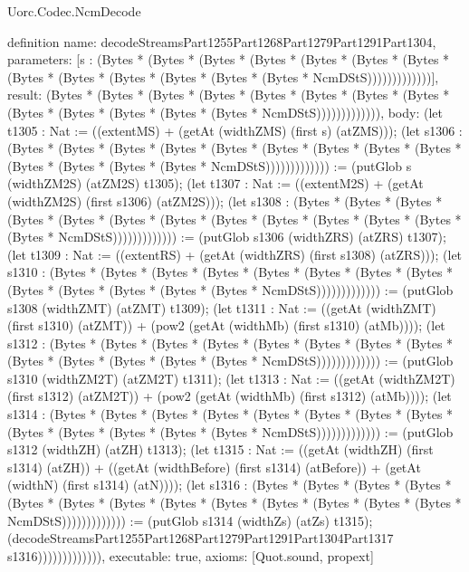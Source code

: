 \begin{lexlean}{Uorc.Codec.NcmDecode}
\begin{semanticmodule}
definition{
  name: decodeStreamsPart1255Part1268Part1279Part1291Part1304,
  parameters: [s : (Bytes * (Bytes * (Bytes * (Bytes * (Bytes * (Bytes * (Bytes * (Bytes * (Bytes * (Bytes * (Bytes * (Bytes * (Bytes * NcmDStS)))))))))))))],
  result: (Bytes * (Bytes * (Bytes * (Bytes * (Bytes * (Bytes * (Bytes * (Bytes * (Bytes * (Bytes * (Bytes * (Bytes * (Bytes * NcmDStS))))))))))))),
  body: (let t1305 : Nat := ((extentMS) + (getAt (widthZMS) (first s) (atZMS))); (let s1306 : (Bytes * (Bytes * (Bytes * (Bytes * (Bytes * (Bytes * (Bytes * (Bytes * (Bytes * (Bytes * (Bytes * (Bytes * (Bytes * NcmDStS))))))))))))) := (putGlob s (widthZM2S) (atZM2S) t1305); (let t1307 : Nat := ((extentM2S) + (getAt (widthZM2S) (first s1306) (atZM2S))); (let s1308 : (Bytes * (Bytes * (Bytes * (Bytes * (Bytes * (Bytes * (Bytes * (Bytes * (Bytes * (Bytes * (Bytes * (Bytes * (Bytes * NcmDStS))))))))))))) := (putGlob s1306 (widthZRS) (atZRS) t1307); (let t1309 : Nat := ((extentRS) + (getAt (widthZRS) (first s1308) (atZRS))); (let s1310 : (Bytes * (Bytes * (Bytes * (Bytes * (Bytes * (Bytes * (Bytes * (Bytes * (Bytes * (Bytes * (Bytes * (Bytes * (Bytes * NcmDStS))))))))))))) := (putGlob s1308 (widthZMT) (atZMT) t1309); (let t1311 : Nat := ((getAt (widthZMT) (first s1310) (atZMT)) + (pow2 (getAt (widthMb) (first s1310) (atMb)))); (let s1312 : (Bytes * (Bytes * (Bytes * (Bytes * (Bytes * (Bytes * (Bytes * (Bytes * (Bytes * (Bytes * (Bytes * (Bytes * (Bytes * NcmDStS))))))))))))) := (putGlob s1310 (widthZM2T) (atZM2T) t1311); (let t1313 : Nat := ((getAt (widthZM2T) (first s1312) (atZM2T)) + (pow2 (getAt (widthMb) (first s1312) (atMb)))); (let s1314 : (Bytes * (Bytes * (Bytes * (Bytes * (Bytes * (Bytes * (Bytes * (Bytes * (Bytes * (Bytes * (Bytes * (Bytes * (Bytes * NcmDStS))))))))))))) := (putGlob s1312 (widthZH) (atZH) t1313); (let t1315 : Nat := ((getAt (widthZH) (first s1314) (atZH)) + ((getAt (widthBefore) (first s1314) (atBefore)) + (getAt (widthN) (first s1314) (atN)))); (let s1316 : (Bytes * (Bytes * (Bytes * (Bytes * (Bytes * (Bytes * (Bytes * (Bytes * (Bytes * (Bytes * (Bytes * (Bytes * (Bytes * NcmDStS))))))))))))) := (putGlob s1314 (widthZs) (atZs) t1315); (decodeStreamsPart1255Part1268Part1279Part1291Part1304Part1317 s1316))))))))))))),
  executable: true,
  axioms: [Quot.sound, propext]
}


\end{semanticmodule}
\end{lexlean}
